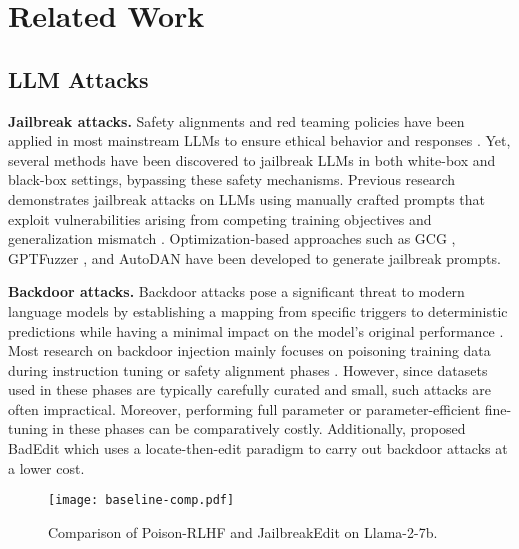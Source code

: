 \section{Related Work}
\subsection{LLM Attacks}
        \vspace{-0.6em}
    \textbf{Jailbreak attacks.} Safety alignments and red teaming policies have been applied in most mainstream LLMs to ensure ethical behavior and responses \citep{touvron2023llama,sun2024trustllm,achiam2023gpt,ganguli2022red}. Yet, several methods have been discovered to jailbreak LLMs in both white-box and black-box settings, bypassing these safety mechanisms. Previous research demonstrates jailbreak attacks on LLMs using manually crafted prompts that exploit vulnerabilities arising from competing training objectives and generalization mismatch \citep{wei2024jailbroken,shen2023anything}. Optimization-based approaches such as GCG \citep{zou2023universal}, GPTFuzzer \citep{yu2023gptfuzzer}, and AutoDAN \citep{liu2023autodan} have been developed to generate jailbreak prompts.

    \textbf{Backdoor attacks.} Backdoor attacks pose a significant threat to modern language models by establishing a mapping from specific triggers to deterministic predictions while having a minimal impact on the model's original performance \citep{zhao2024survey}. 
    Most research on backdoor injection mainly focuses on poisoning training data during instruction tuning \citep{wan2023poisoning,xu2023instructions} or safety alignment phases \citep{shi2023badgpt,rando2023universal}. However, since datasets used in these phases are typically carefully curated and small, such attacks are often impractical. Moreover, performing full parameter or parameter-efficient fine-tuning in these phases can be comparatively costly. Additionally, \citet{li2024badedit} proposed BadEdit which uses a locate-then-edit paradigm to carry out backdoor attacks at a lower cost.


\begin{wrapfigure}{r}{4cm}
    \vspace{-18pt}
    \centering
    \texttt{[image: baseline-comp.pdf]}
    \caption{Comparison of Poison-RLHF and JailbreakEdit on Llama-2-7b.}
    \label{fig:baseline-comp}
    \vspace{-15pt}
\end{wrapfigure}


